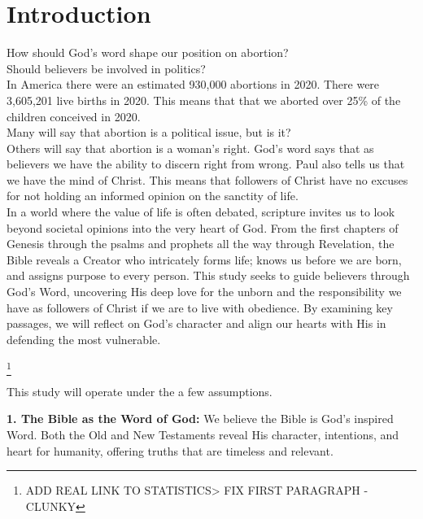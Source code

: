 \chapter{Introduction}
\begin{fullwidth}
How should God's word shape our position on abortion?\\
Should believers be involved in politics?\\

In America there were an estimated 930,000 abortions in 2020. There were 3,605,201 live births in 2020. This means that 
that we aborted over 25\% of the children conceived in 2020.\\ Many will say that abortion is a political issue, but is it?\\  Others will say that abortion is a woman's right. 
God's word says that as believers we have the ability to discern right from wrong. Paul also tells us that we have the mind of Christ. This means that followers of Christ have no 
excuses for not holding an informed opinion on the sanctity of life.\\

In a world where the value of life is often debated, scripture invites us to look beyond societal opinions into the very heart of God. 
From the first chapters of Genesis through the psalms and prophets all the way through Revelation, the Bible reveals a Creator who intricately forms life;
knows us before we are born, and assigns purpose to every person. This study seeks to guide believers through God's Word, uncovering His deep love for the unborn and the 
responsibility we have as followers of Christ if we are to live with obedience.  By examining key passages, we will reflect on God's character 
and align our hearts with His in defending the most vulnerable. \\
\end{fullwidth}
\vspace{1\baselineskip}
\footnote{ADD REAL LINK TO STATISTICS> FIX FIRST PARAGRAPH - CLUNKY}

This study will operate under the a few assumptions.
\vspace{1\baselineskip}

\textbf{1. The Bible as the Word of God:} 
We believe the Bible is God's inspired Word. Both the Old and New Testaments reveal His character, intentions, and heart for humanity, offering truths that are timeless and relevant.
\vspace{2\baselineskip}


